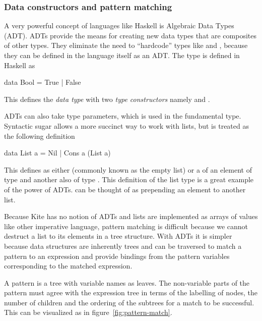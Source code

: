 \subsubsection{Data constructors and pattern matching}
A very powerful concept of languages like Haskell is Algebraic Data Types (ADT). ADTs provide the means for creating new data types that are composites of other types. They eliminate the need to ``hardcode'' types like  and , because they can be defined in the language itself as an ADT. The  type is defined in Haskell as

\begin{haskell}
data Bool = True | False
\end{haskell}

This defines the \emph{data type}  with two \emph{type constructors} namely  and .

ADTs can also take type parameters, which is used in the fundamental  type. Syntactic sugar allows a more succinct way to work with lists, but is treated as the following definition

\begin{haskell}
data List a = Nil | Cons a (List a)
\end{haskell}

This defines  as either  (commonly known as the empty list) or a  of an element of type  and another  also of type . This definition of the list type is a great example of the power of ADTs.  can be thought of as prepending an element to another list.

Because Kite has no notion of ADTs and lists are implemented as arrays of values like other imperative language, pattern matching is difficult because we cannot destruct a list to its elements in a tree structure. With ADTs it is simpler because data structures are inherently trees and can be traversed to match a pattern to an expression and provide bindings from the pattern variables corresponding to the matched expression.

A pattern is a tree with variable names as leaves. The non-variable parts of the pattern must agree with the expression tree in terms of the labelling of nodes, the number of children and the ordering of the subtrees\cite[p. 514]{wilhelm95} for a match to be successful. This can be visualized as in figure~\ref{fig:pattern-match}.

